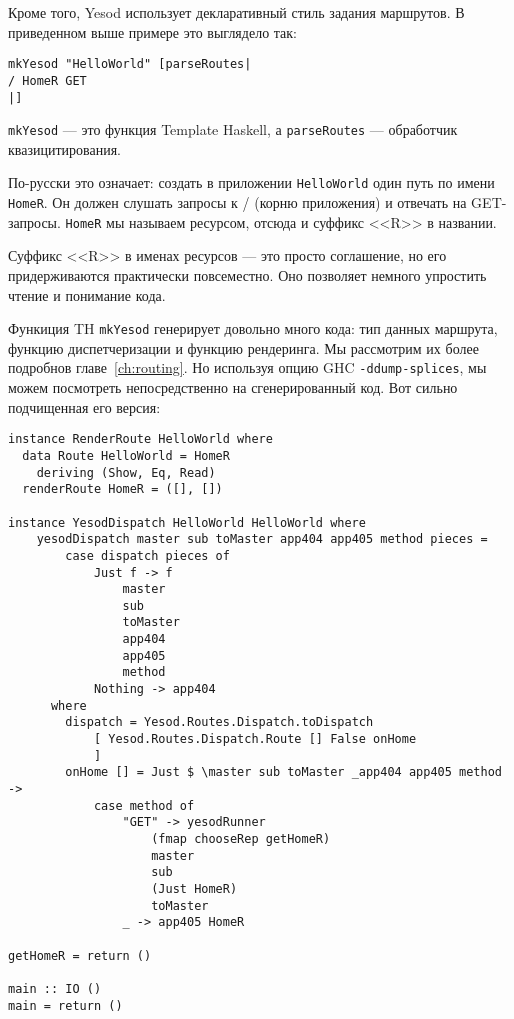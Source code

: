 Кроме того, Yesod использует декларативный стиль задания маршрутов. В приведенном выше
примере это выглядело так:

\begin{lstlisting}
mkYesod "HelloWorld" [parseRoutes|
/ HomeR GET
|]
\end{lstlisting}

\begin{remark}
  \lstinline!mkYesod! --- это функция Template Haskell, а \lstinline!parseRoutes! --- 
  обработчик квазицитирования.
\end{remark}

По-русски это означает: создать в приложении \texttt{HelloWorld} один путь по имени
\lstinline!HomeR!. Он должен слушать запросы к / (корню приложения) и отвечать на
GET-запросы. \lstinline!HomeR! мы называем ресурсом, отсюда и суффикс <<R>> в названии.

\begin{remark}
  Суффикс <<R>> в именах ресурсов --- это просто соглашение, но его придерживаются
  практически повсеместно. Оно позволяет немного упростить чтение и понимание кода.
\end{remark}

Функиция TH \lstinline!mkYesod! генерирует довольно много кода: тип данных маршрута,
функцию диспетчеризации и функцию рендеринга. Мы рассмотрим их более подробнов
главе~\ref{ch:routing}. Но используя опцию GHC \lstinline'-ddump-splices', мы можем
посмотреть непосредственно на сгенерированный код. Вот сильно подчищенная его
версия:

\begin{lstlisting}
instance RenderRoute HelloWorld where
  data Route HelloWorld = HomeR
    deriving (Show, Eq, Read)
  renderRoute HomeR = ([], [])

instance YesodDispatch HelloWorld HelloWorld where
    yesodDispatch master sub toMaster app404 app405 method pieces =
        case dispatch pieces of
            Just f -> f
                master
                sub
                toMaster
                app404
                app405
                method
            Nothing -> app404
      where
        dispatch = Yesod.Routes.Dispatch.toDispatch
            [ Yesod.Routes.Dispatch.Route [] False onHome
            ]
        onHome [] = Just $ \master sub toMaster _app404 app405 method ->
            case method of
                "GET" -> yesodRunner
                    (fmap chooseRep getHomeR)
                    master
                    sub
                    (Just HomeR)
                    toMaster
                _ -> app405 HomeR

getHomeR = return ()

main :: IO ()
main = return ()
\end{lstlisting}

